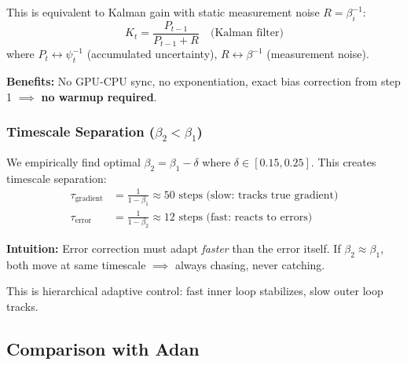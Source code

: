 This is equivalent to Kalman gain with static measurement noise $R = \beta_i^{-1}$:
\begin{equation}
K_t = \frac{P_{t-1}}{P_{t-1} + R} \quad \text{(Kalman filter)}
\end{equation}
where $P_t \leftrightarrow \psi_t^{-1}$ (accumulated uncertainty), $R \leftrightarrow \beta^{-1}$ (measurement noise).

\textbf{Benefits:} No GPU-CPU sync, no exponentiation, exact bias correction from step 1 $\implies$ \textbf{no warmup required}.

\subsubsection{Timescale Separation (\texorpdfstring{$\beta_2 < \beta_1$}{beta2 < beta1})}

We empirically find optimal $\beta_2 = \beta_1 - \delta$ where $\delta \in [0.15, 0.25]$. This creates timescale separation:
\begin{align}
\tau_{\text{gradient}} &= \frac{1}{1-\beta_1} \approx 50 \text{ steps (slow: tracks true gradient)} \\
\tau_{\text{error}} &= \frac{1}{1-\beta_2} \approx 12 \text{ steps (fast: reacts to errors)}
\end{align}

\textbf{Intuition:} Error correction must adapt \emph{faster} than the error itself. If $\beta_2 \approx \beta_1$, both move at same timescale $\implies$ always chasing, never catching.

This is hierarchical adaptive control: fast inner loop stabilizes, slow outer loop tracks.

\subsection{Comparison with Adan}

